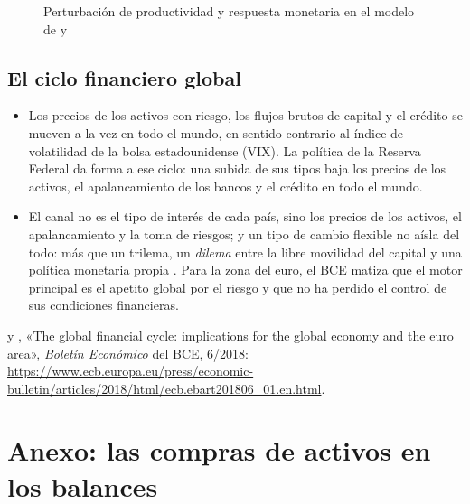 \documentclass[11pt]{article}
\begin{document}
\begin{figure}[H]
\centering
\caption{Perturbación de productividad y respuesta monetaria en el modelo de  y }\label{fig:corsetti-pesenti}
\end{figure}

\subsection*{El ciclo financiero global}
\begin{itemize}
\item Los precios de los activos con riesgo, los flujos brutos de capital y el crédito se mueven a la vez en todo el mundo, en sentido contrario al índice de volatilidad de la bolsa estadounidense (VIX). La política de la Reserva Federal da forma a ese ciclo: una subida de sus tipos baja los precios de los activos, el apalancamiento de los bancos y el crédito en todo el mundo\nocite{Rey2013Dilema,MirandaAgrippinoRey2020}.
\item El canal no es el tipo de interés de cada país, sino los precios de los activos, el apalancamiento y la toma de riesgos; y un tipo de cambio flexible no aísla del todo: más que un trilema, un \emph{dilema} entre la libre movilidad del capital y una política monetaria propia . Para la zona del euro, el BCE matiza que el motor principal es el apetito global por el riesgo y que no ha perdido el control de sus condiciones financieras\nocite{HabibVenditti2018}.
\end{itemize}

\begin{anotaciones}
 y , «The global financial cycle: implications for the global economy and the euro area», \emph{Boletín Económico} del BCE, 6/2018\nocite{HabibVenditti2018}: \url{https://www.ecb.europa.eu/press/economic-bulletin/articles/2018/html/ecb.ebart201806_01.en.html}.
\end{anotaciones}

\section{Anexo: las compras de activos en los balances}\label{anexo:compras-balances}
\end{document}
